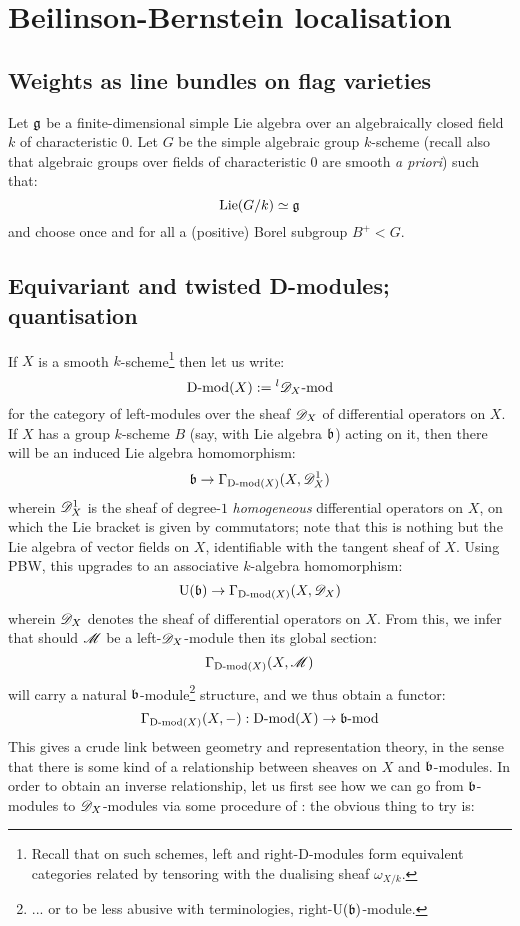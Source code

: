 \section{Beilinson-Bernstein localisation}
    \subsection{Weights as line bundles on flag varieties}
        Let $\mathfrak{g}$ be a finite-dimensional simple Lie algebra over an algebraically closed field $k$ of characteristic $0$. Let $G$ be the simple algebraic group $k$-scheme (recall also that algebraic groups over fields of characteristic $0$ are smooth \textit{a priori}) such that:
            $$\mathrm{Lie}(G/k) \simeq \mathfrak{g}$$
        and choose once and for all a (positive) Borel subgroup $B^+ < G$.

    \subsection{Equivariant and twisted D-modules; quantisation}
        If $X$ is a smooth $k$-scheme\footnote{Recall that on such schemes, left and right-D-modules form equivalent categories related by tensoring with the dualising sheaf $\omega_{X/k}$.} then let us write:
            $$\mathrm{D}\text{-}\mathrm{mod}(X) := {}^l\mathscr{D}_X\text{-}\mathrm{mod}$$
        for the category of left-modules over the sheaf $\mathscr{D}_X$ of differential operators on $X$. If $X$ has a group $k$-scheme $B$ (say, with Lie algebra $\mathfrak{b}$) acting on it, then there will be an induced Lie algebra homomorphism:
            $$\mathfrak{b} \to \Gamma_{\mathrm{D}\text{-}\mathrm{mod}(X)}(X, \mathscr{D}^1_X)$$
        wherein $\mathscr{D}_X^1$ is the sheaf of degree-$1$ \textit{homogeneous} differential operators on $X$, on which the Lie bracket is given by commutators; note that this is nothing but the Lie algebra of vector fields on $X$, identifiable with the tangent sheaf of $X$. Using PBW, this upgrades to an associative $k$-algebra homomorphism:
            $$\mathrm{U}(\mathfrak{b}) \to \Gamma_{\mathrm{D}\text{-}\mathrm{mod}(X)}(X, \mathscr{D}_X)$$
        wherein $\mathscr{D}_X$ denotes the sheaf of differential operators on $X$. From this, we infer that should $\mathscr{M}$ be a left-$\mathscr{D}_X$-module then its global section:
            $$\Gamma_{\mathrm{D}\text{-}\mathrm{mod}(X)}(X, \mathscr{M})$$
        will carry a natural $\mathfrak{b}$-module\footnote{... or to be less abusive with terminologies, right-$\mathrm{U}(\mathfrak{b})$-module.} structure, and we thus obtain a functor:
            $$\Gamma_{\mathrm{D}\text{-}\mathrm{mod}(X)}(X, -): \mathrm{D}\text{-}\mathrm{mod}(X) \to \mathfrak{b}\text{-}\mathrm{mod}$$
        This gives a crude link between geometry and representation theory, in the sense that there is some kind of a relationship between sheaves on $X$ and $\mathfrak{b}$-modules. In order to obtain an inverse relationship, let us first see how we can go from $\mathfrak{b}$-modules to $\mathscr{D}_X$-modules via some procedure of : the obvious thing to try is:
